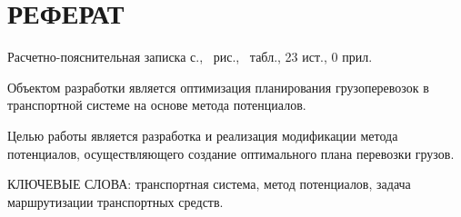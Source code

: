 \section*{РЕФЕРАТ}

Расчетно-пояснительная записка \pageref{LastPage} с., \totalfigures\ рис., \totaltables\ табл., 23 ист., 0 прил.

Объектом разработки является оптимизация планирования грузоперевозок в транспортной системе на основе метода потенциалов.

Целью работы является разработка и реализация модификации метода потенциалов, осуществляющего создание оптимального плана перевозки грузов.

КЛЮЧЕВЫЕ СЛОВА: транспортная система, метод потенциалов, задача маршрутизации транспортных средств.

\pagebreak